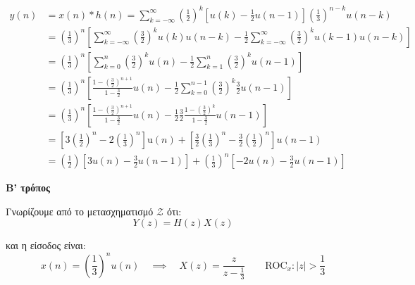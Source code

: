 \documentclass[11pt,a4paper,notitlepage,fleqn,draft]{article}
\begin{document}
\begin{exercise}
\begin{enumpar}
\begin{enumgreekpar}
	\begin{align*}
		y(n) &= x(n) * h(n) = \sum_{k=-\infty}^{\infty}\left(\frac{1}{2}\right)^k\left[
		u(k) - \frac{1}{2}u(n-1)
		\right]\left(\frac{1}{3}\right)^{n-k}u(n-k)
		\\ &= \left(\frac{1}{3}\right)^n\left[
		\sum_{k=-\infty}^{\infty} \left(\frac{3}{2}\right)^k u(k)u(n-k) - \frac{1}{2}\sum_{k=-\infty}^{\infty}\left(\frac{3}{2}\right)^k u(k-1)u(n-k)
		\right]
		\\ &= \left(\frac{1}{3}\right)^n \left[\sum_{k=0}^{n}\left(\frac{3}{2}\right)^k u(n)
		-\frac{1}{2}\sum_{k=1}^{n}\left(\frac{3}{2}\right)^k u(n-1)\right]
		\\ &= \left(\frac{1}{3}\right)^n\left[
		\frac{1-\left(\frac{3}{2}\right)^{n+1}}{1-\frac{3}{2}}u(n)
		-\frac{1}{2}\sum_{k=0}^{n-1}\left(\frac{3}{2}\right)^k \frac{3}{2}u(n-1)
		\right]
		\\ &= \left(\frac{1}{3}\right)^n\left[
		\frac{1-\left(\frac{3}{2}\right)^{n+1}}{1-\frac{3}{2}}u(n)
		-\frac{1}{2}\frac{3}{2}\frac{1-\left(\frac{3}{2}\right)^k}{1-\frac{3}{2}}u(n-1)
		\right]
		\\ &= \left[3\left(\frac{1}{2}\right)^n - 2\left(\frac{1}{3}\right)^n\right]\mathrm{u}(n)
		+\left[\frac{3}{2}\left(\frac{1}{3}\right)^n-\frac{3}{2}\left(\frac{1}{2}\right)^n\right]u(n-1)
		\\ &= \left(\frac{1}{2}\right)\left[3u(n)-\frac{3}{2}u(n-1)\right]
		+ \left(\frac{1}{3}\right)^n \left[ -2u(n)-\frac{3}{2}u(n-1) \right]
	\end{align*}
	\item \textbf{Β' τρόπος}
	
	Γνωρίζουμε από το μετασχηματισμό \( \mathcal{Z} \) ότι:
	\[
	Y(z) = H(z)X(z)
	\]
	
	και η είσοδος είναι:
	\[
	x(n) = \left(\frac{1}{3}\right)^n u(n) \quad \implies \quad X(z) = \frac{z}{z-\frac{1}{3}}
	\qquad \text{ROC}_x:|z|>\frac{1}{3}
	\]
	

\end{enumgreekpar}
\end{enumpar}
\end{exercise}
\end{document}
